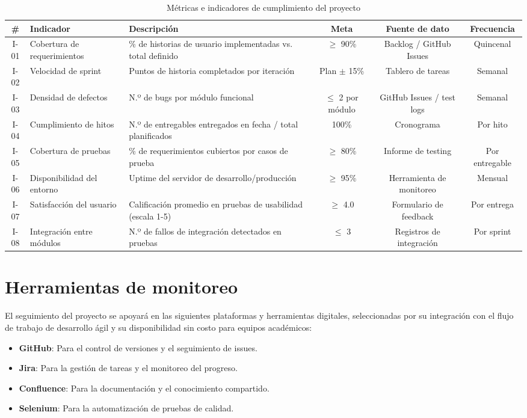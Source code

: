 \begin{table}[h]
\scriptsize
\centering
\begin{tabular}{|c|p{2.1cm}|p{3.2cm}|c|c|c|}
\hline
\textbf{\#} & \textbf{Indicador} & \textbf{Descripción} & \textbf{Meta} & \textbf{Fuente de dato} & \textbf{Frecuencia} \\
\hline
I-01 & Cobertura de requerimientos & \% de historias de usuario implementadas vs. total definido & $\geq$ 90\% & Backlog / GitHub Issues & Quincenal \\
\hline
I-02 & Velocidad de sprint & Puntos de historia completados por iteración & Plan $\pm$ 15\% & Tablero de tareas & Semanal \\
\hline
I-03 & Densidad de defectos & N.º de bugs por módulo funcional & $\leq$ 2 por módulo & GitHub Issues / test logs & Semanal \\
\hline
I-04 & Cumplimiento de hitos & N.º de entregables entregados en fecha / total planificados & 100\% & Cronograma & Por hito \\
\hline
I-05 & Cobertura de pruebas & \% de requerimientos cubiertos por casos de prueba & $\geq$ 80\% & Informe de testing & Por entregable \\
\hline
I-06 & Disponibilidad del entorno & Uptime del servidor de desarrollo/producción & $\geq$ 95\% & Herramienta de monitoreo & Mensual \\
\hline
I-07 & Satisfacción del usuario & Calificación promedio en pruebas de usabilidad (escala 1-5) & $\geq$ 4.0 & Formulario de feedback & Por entrega \\
\hline
I-08 & Integración entre módulos & N.º de fallos de integración detectados en pruebas & $\leq$ 3 & Registros de integración & Por sprint \\
\hline
\end{tabular}
\caption{Métricas e indicadores de cumplimiento del proyecto}
\end{table}

\section{Herramientas de monitoreo}

El seguimiento del proyecto se apoyará en las siguientes plataformas y herramientas digitales,
seleccionadas por su integración con el flujo de trabajo de desarrollo ágil y su disponibilidad
sin costo para equipos académicos:

\begin{itemize}
    \item \textbf{GitHub}: Para el control de versiones y el seguimiento de issues.
    \item \textbf{Jira}: Para la gestión de tareas y el monitoreo del progreso.
    \item \textbf{Confluence}: Para la documentación y el conocimiento compartido.
    \item \textbf{Selenium}: Para la automatización de pruebas de calidad.
\end{itemize}

